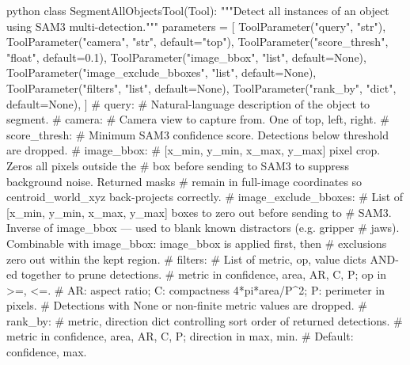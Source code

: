 \label{fig:sam3_api}
\begin{appendixcode}{python}
class SegmentAllObjectsTool(Tool):
    """Detect all instances of an object using SAM3 multi-detection."""
    parameters = [
        ToolParameter("query",                "str"),
        ToolParameter("camera",               "str",   default="top"),
        ToolParameter("score_thresh",         "float", default=0.1),
        ToolParameter("image_bbox",           "list",  default=None),
        ToolParameter("image_exclude_bboxes", "list",  default=None),
        ToolParameter("filters",              "list",  default=None),
        ToolParameter("rank_by",              "dict",  default=None),
    ]
    # query:
    #     Natural-language description of the object to segment.
    # camera:
    #     Camera view to capture from. One of {top, left, right}.
    # score_thresh:
    #     Minimum SAM3 confidence score. Detections below threshold are dropped.
    # image_bbox:
    #     [x_min, y_min, x_max, y_max] pixel crop. Zeros all pixels outside the
    #     box before sending to SAM3 to suppress background noise. Returned masks
    #     remain in full-image coordinates so centroid_world_xyz back-projects correctly.
    # image_exclude_bboxes:
    #     List of [x_min, y_min, x_max, y_max] boxes to zero out before sending to
    #     SAM3. Inverse of image_bbox — used to blank known distractors (e.g. gripper
    #     jaws). Combinable with image_bbox: image_bbox is applied first, then
    #     exclusions zero out within the kept region.
    # filters:
    #     List of {metric, op, value} dicts AND-ed together to prune detections.
    #     metric in {confidence, area, AR, C, P}; op in {>=, <=}.
    #     AR: aspect ratio; C: compactness 4*pi*area/P^2; P: perimeter in pixels.
    #     Detections with None or non-finite metric values are dropped.
    # rank_by:
    #     {metric, direction} dict controlling sort order of returned detections.
    #     metric in {confidence, area, AR, C, P}; direction in {max, min}.
    #     Default: {confidence, max}.


\end{appendixcode}

